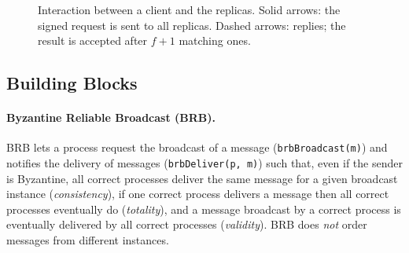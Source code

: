 \documentclass[sigconf,a4paper]{acmart}
\newcommand{\api}[1]{\texttt{#1}}
\begin{document}
    \begin{figure}[t]
        \centering
        \caption{Interaction between a client and the replicas. Solid arrows: the
        signed request is sent to all replicas. Dashed arrows: replies; the result
        is accepted after $f+1$ matching ones.}
        \label{fig:client}
    \end{figure}

    \subsection{Building Blocks}

    \paragraph{Byzantine Reliable Broadcast (BRB).} BRB
    \cite{asynchronous-byzantine-agreement-protocols,introduction-to-reliable-and-secure-distributed-programming}
    lets a process request the broadcast of a message
    (\api{brbBroadcast(m)}) and notifies the delivery of messages
    (\api{brbDeliver(p, m)}) such that, even if the sender is Byzantine, all
    correct processes deliver the same message for a given broadcast instance
    (\emph{consistency}), if one correct process delivers a message then all
    correct processes eventually do (\emph{totality}), and a message broadcast by
    a correct process is eventually delivered by all correct processes
    (\emph{validity}). BRB does \emph{not} order messages from different
    instances.
\end{document}
